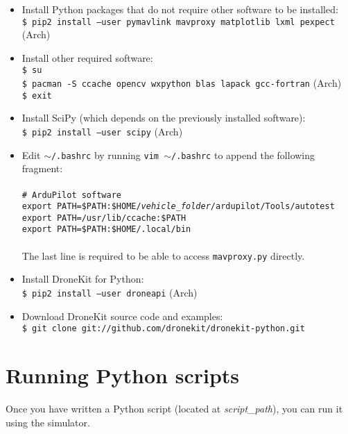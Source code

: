 \documentclass{article}
\newcommand{\arch}{{\color{red} (Arch)}}
\begin{document}
\begin{itemize}
          First, install {\tt pip} for Python 2: \\
          {\tt \$ su} \\
          {\tt \$ pacman -S python2-pip} \arch{} \\
          {\tt \$ exit}
    \item Install Python packages that do not require other software to be 
          installed: \\
          {\tt \$ pip2 install --user pymavlink mavproxy matplotlib lxml pexpect} \arch{}
    \item Install other required software: \\
          {\tt \$ su} \\
          {\tt \$ pacman -S ccache opencv wxpython blas lapack gcc-fortran} \arch{} \\
          {\tt \$ exit}
    \item Install SciPy (which depends on the previously installed software): \\
          {\tt \$ pip2 install --user scipy} \arch{}
    \item Edit {\tt $\sim$/.bashrc} by running {\tt vim $\sim$/.bashrc} to 
          append the following fragment: \\\\
          {\tt \# ArduPilot software} \\
          {\tt export PATH=\$PATH:\$HOME/\emph{vehicle\_folder}/ardupilot/Tools/autotest} \\
          {\tt export PATH=/usr/lib/ccache:\$PATH} \\
          {\tt export PATH=\$PATH:\$HOME/.local/bin} \\\\
          The last line is required to be able to access {\tt mavproxy.py} 
          directly.
    \item Install DroneKit for Python: \\
          {\tt \$ pip2 install --user droneapi} \arch{}
    \item Download DroneKit source code and examples: \\
          {\tt \$ git clone git://github.com/dronekit/dronekit-python.git}
\end{itemize}

\section{Running Python scripts}
Once you have written a Python script (located at \emph{script\_path}), you can 
run it using the simulator.
\end{document}
